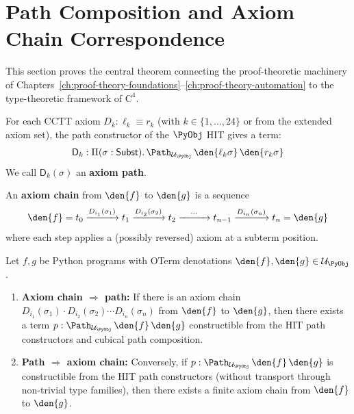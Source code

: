 \section{Path Composition and Axiom Chain Correspondence}
\label{sec:path-axiom}

This section proves the central theorem connecting the proof-theoretic
machinery of Chapters~\ref{ch:proof-theory-foundations}--\ref{ch:proof-theory-automation}
to the type-theoretic framework of $\mathrm{C}^4$.

\begin{definition}
\label{def:axiom-path}
For each CCTT axiom $D_k : \ell_k \equiv r_k$ (with $k \in \{1, \ldots, 24\}$
or from the extended axiom set), the path constructor of the $\PyObj$ HIT
gives a term:
\[
  \mathsf{D}_k : \Pi(\sigma : \mathsf{Subst}).\,
    \Path_{\mathcal{U}_\PyObj}\, \den{\ell_k\sigma}\, \den{r_k\sigma}
\]
We call $\mathsf{D}_k(\sigma)$ an \textbf{axiom path}.
\end{definition}

\begin{definition}
\label{def:axiom-chain}
An \textbf{axiom chain} from $\den{f}$ to $\den{g}$ is a sequence
\[
  \den{f} = t_0 \xrightarrow{D_{i_1}(\sigma_1)} t_1
    \xrightarrow{D_{i_2}(\sigma_2)} t_2
    \xrightarrow{\quad\cdots\quad} t_{n-1}
    \xrightarrow{D_{i_n}(\sigma_n)} t_n = \den{g}
\]
where each step applies a (possibly reversed) axiom at a subterm position.
\end{definition}

\begin{theorem}
\label{thm:path-axiom}
Let $f, g$ be Python programs with OTerm denotations $\den{f}, \den{g}
\in \mathcal{U}_\PyObj$.
\begin{enumerate}
\item \textbf{Axiom chain $\Rightarrow$ path:}
  If there is an axiom chain $D_{i_1}(\sigma_1) \cdot D_{i_2}(\sigma_2)
  \cdots D_{i_n}(\sigma_n)$ from $\den{f}$ to $\den{g}$, then there
  exists a term $p : \Path_{\mathcal{U}_\PyObj}\, \den{f}\, \den{g}$
  constructible from the HIT path constructors and cubical path
  composition.

\item \textbf{Path $\Rightarrow$ axiom chain:}
  Conversely, if $p : \Path_{\mathcal{U}_\PyObj}\, \den{f}\, \den{g}$ is
  constructible from the HIT path constructors (without transport through
  non-trivial type families), then there exists a finite axiom chain from
  $\den{f}$ to $\den{g}$.
\end{enumerate}
\end{theorem}


